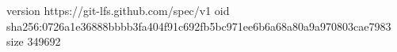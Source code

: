 version https://git-lfs.github.com/spec/v1
oid sha256:0726a1e36888bbbb3fa404f91c692fb5bc971ee6b6a68a80a9a970803cae7983
size 349692
